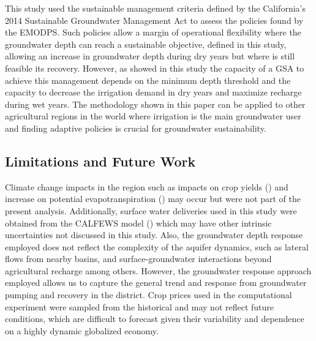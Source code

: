 \documentclass[11pt,a4paper]{article}
\begin{document}
This study used the sustainable management criteria defined by the California’s 2014 Sustainable Groundwater Management Act to assess the policies found by the EMODPS. Such policies allow a margin of operational flexibility where the groundwater depth can reach a sustainable objective, defined in this study, allowing an increase in groundwater depth during dry years but where is still feasible its recovery. However, as showed in this  study the capacity of a GSA to achieve this management depends on the minimum depth threshold and the capacity to decrease the irrigation demand in dry years and maximize recharge during wet years. The methodology shown in this paper can be applied to other agricultural regions in the world where irrigation is the main groundwater user and finding adaptive policies is crucial for groundwater sustainability. 

\subsection{Limitations and Future Work}

Climate change impacts in the region such as impacts on crop yields (\cite{blanc_is_2017}) and increase on potential evapotranspiration (\cite{mcevoy_projected_2020,vahmani_will_2022}) may occur but were not part of the present analysis. Additionally, surface water deliveries used in this study were obtained from the CALFEWS model (\cite{zeff_californias_2021}) which may have other intrinsic uncertainties not discussed in this study. Also, the groundwater depth response employed does not reflect the complexity of the aquifer dynamics, such as lateral flows from nearby basins, and surface-groundwater interactions beyond agricultural recharge among others. However, the groundwater response approach employed allows us to capture the general trend and response from groundwater pumping and recovery in the district. Crop prices used in the computational experiment were sampled from the historical and may not reflect future conditions, which are difficult to forecast given their variability and dependence on a highly dynamic globalized economy. 
\end{document}
